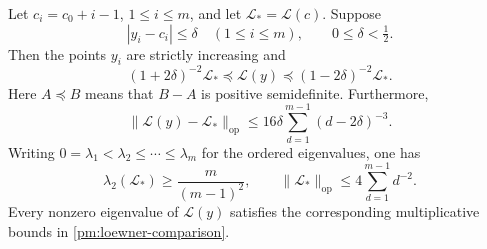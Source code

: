 \begin{theorem}
\label{pm:clock-matrix}
Let \(c_i=c_0+i-1\), \(1\le i\le m\), and let
\(\mathcal L_* =\mathcal L(c)\).  Suppose
\begin{equation}
 |y_i-c_i|\le\delta\quad(1\le i\le m),\qquad 0\le\delta<\tfrac12.
 \label{pm:clock-error}
\end{equation}
Then the points \(y_i\) are strictly increasing and
\begin{equation}
 (1+2\delta)^{-2}\mathcal L_*
   \preceq\mathcal L(y)
   \preceq(1-2\delta)^{-2}\mathcal L_*.
 \label{pm:loewner-comparison}
\end{equation}
Here \(A\preceq B\) means that \(B-A\) is positive semidefinite.
Furthermore,
\begin{equation}
 \|\mathcal L(y)-\mathcal L_*\|_{\mathrm{op}}
 \le16\delta\sum_{d=1}^{m-1}(d-2\delta)^{-3}.
 \label{pm:operator-comparison}
\end{equation}
Writing \(0=\lambda_1<\lambda_2\le\cdots\le\lambda_m\) for the
ordered eigenvalues, one has
\begin{equation}
 \lambda_2(\mathcal L_*)\ge\frac{m}{(m-1)^2},\qquad
 \|\mathcal L_*\|_{\mathrm{op}}
   \le4\sum_{d=1}^{m-1}d^{-2}.
 \label{pm:clock-spectrum}
\end{equation}
Every nonzero eigenvalue of \(\mathcal L(y)\) satisfies the corresponding
multiplicative bounds in \eqref{pm:loewner-comparison}.
\end{theorem}

